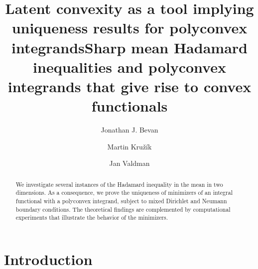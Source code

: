 \documentclass[12pt]{amsart}
\title{ Latent convexity as a tool implying  uniqueness results for polyconvex integrands}
\newcommand{\1}{{\bf 1}}
\begin{document}
\author[J. Bevan]{Jonathan J. Bevan}
\address[J. Bevan]{School of Mathematics and Physics, University of Surrey, Guildford, GU2 7XH, United Kingdom. }

\author[M. Kru\v{z}\'{i}k]
{Martin Kru\v{z}\'{i}k}
\address[M. Kru\v{z}\'{i}k]{ Czech Academy of Sciences, Institute of Information Theory and Automation,
Pod vod\'arenskou v\v{e}\v z\'\i\ 4, 182 00, Prague 8, Czechia $\&$
Department of Physics, Faculty of Civil Engineering, Czech Technical University in Prague, Thákurova 7, 166 29 Prague 6, Czechia.
}


\author[J. Valdman] {Jan Valdman} 
\address[J. Valdman]{Czech Academy of Sciences, Institute of Information Theory and Automation, Pod vod\'arenskou v\v{e}\v z\'\i\ 4, 182 00, Prague 8, Czechia 
}


\title[Mean Hadamard inequalities and convex functionals]{Sharp mean Hadamard inequalities and polyconvex integrands that give rise to convex functionals}
\begin{abstract} 
We investigate several instances of the Hadamard inequality in the mean in two dimensions. As a consequence, we prove the uniqueness of minimizers of an integral functional with a polyconvex integrand, subject to mixed Dirichlet and Neumann boundary conditions. The theoretical findings are complemented by computational experiments that illustrate the behavior of the minimizers.\end{abstract}
\maketitle
\section{Introduction}
\end{document}
